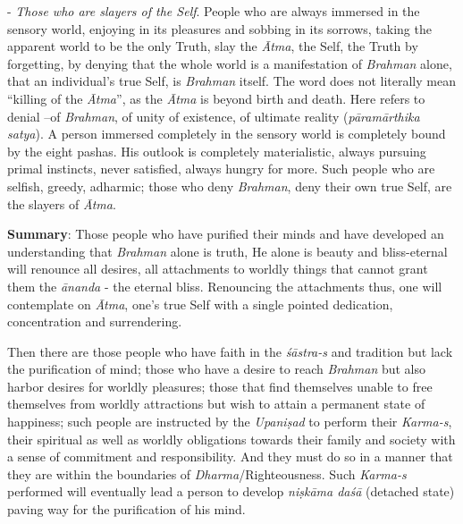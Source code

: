 - \emph{Those who are slayers of the Self}. People who are always immersed in the sensory world, enjoying in its pleasures and sobbing in its sorrows, taking the apparent world to be the only Truth, slay the \emph{Ātma}, the Self, the Truth by forgetting, by denying that the whole world is a manifestation of \emph{Brahman} alone, that an individual's true Self, is \emph{Brahman} itself. The word  does not literally mean ``killing of the \emph{Ātma}'', as the \emph{Ātma} is beyond birth and death. Here  refers to denial --of \emph{Brahman}, of unity of existence, of ultimate reality (\emph{pāramārthika satya}). A person immersed completely in the sensory world is completely bound by the eight pashas. His outlook is completely materialistic, always pursuing primal instincts, never satisfied, always hungry for more. Such people who are selfish, greedy, adharmic; those who deny \emph{Brahman}, deny their own true Self, are the slayers of \emph{Ātma}.

\textbf{Summary}: Those people who have purified their minds and have developed an understanding that \emph{Brahman} alone is truth, He alone is beauty and bliss-eternal will renounce all desires, all attachments to worldly things that cannot grant them the \emph{ānanda} - the eternal bliss. Renouncing the attachments thus, one will contemplate on \emph{Ātma}, one's true Self with a single pointed dedication, concentration and surrendering.

Then there are those people who have faith in the \emph{śāstra-s} and tradition but lack the purification of mind; those who have a desire to reach \emph{Brahman} but also harbor desires for worldly pleasures; those that find themselves unable to free themselves from worldly attractions but wish to attain a permanent state of happiness; such people are instructed by the \emph{Upaniṣad} to perform their \emph{Karma-s}, their spiritual as well as worldly obligations towards their family and society with a sense of commitment and responsibility. And they must do so in a manner that they are within the boundaries of \emph{Dharma}/Righteousness. Such \emph{Karma-s} performed will eventually lead a person to develop \emph{niṣkāma daśā} (detached state) paving way for the purification of his mind.


